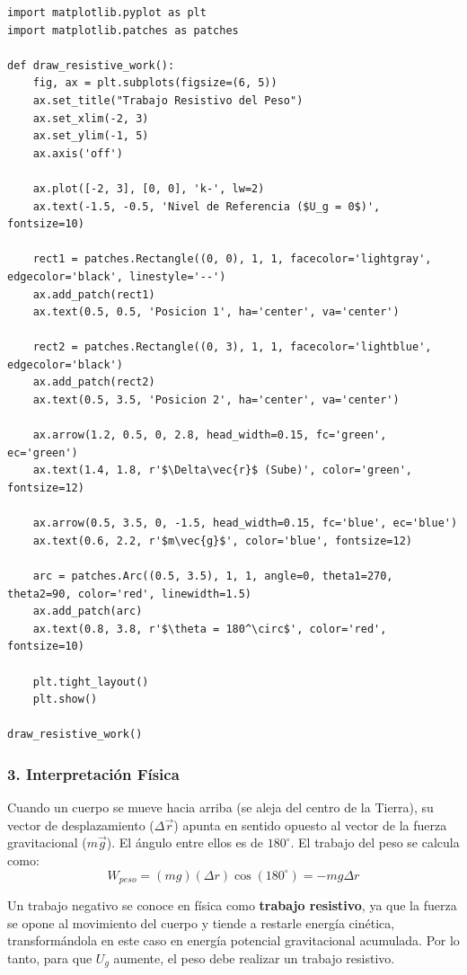 \documentclass[12pt, a4paper]{article}
\begin{document}
\begin{lstlisting}
import matplotlib.pyplot as plt
import matplotlib.patches as patches

def draw_resistive_work():
    fig, ax = plt.subplots(figsize=(6, 5))
    ax.set_title("Trabajo Resistivo del Peso")
    ax.set_xlim(-2, 3)
    ax.set_ylim(-1, 5)
    ax.axis('off')

    ax.plot([-2, 3], [0, 0], 'k-', lw=2)
    ax.text(-1.5, -0.5, 'Nivel de Referencia ($U_g = 0$)', fontsize=10)

    rect1 = patches.Rectangle((0, 0), 1, 1, facecolor='lightgray', edgecolor='black', linestyle='--')
    ax.add_patch(rect1)
    ax.text(0.5, 0.5, 'Posicion 1', ha='center', va='center')

    rect2 = patches.Rectangle((0, 3), 1, 1, facecolor='lightblue', edgecolor='black')
    ax.add_patch(rect2)
    ax.text(0.5, 3.5, 'Posicion 2', ha='center', va='center')

    ax.arrow(1.2, 0.5, 0, 2.8, head_width=0.15, fc='green', ec='green')
    ax.text(1.4, 1.8, r'$\Delta\vec{r}$ (Sube)', color='green', fontsize=12)

    ax.arrow(0.5, 3.5, 0, -1.5, head_width=0.15, fc='blue', ec='blue')
    ax.text(0.6, 2.2, r'$m\vec{g}$', color='blue', fontsize=12)

    arc = patches.Arc((0.5, 3.5), 1, 1, angle=0, theta1=270, theta2=90, color='red', linewidth=1.5)
    ax.add_patch(arc)
    ax.text(0.8, 3.8, r'$\theta = 180^\circ$', color='red', fontsize=10)

    plt.tight_layout()
    plt.show()

draw_resistive_work()
\end{lstlisting}

\subsubsection*{3. Interpretación Física}
Cuando un cuerpo se mueve hacia arriba (se aleja del centro de la Tierra), su vector de desplazamiento ($\Delta\vec{r}$) apunta en sentido opuesto al vector de la fuerza gravitacional ($m\vec{g}$). El ángulo entre ellos es de $180^\circ$.
El trabajo del peso se calcula como:
$$W_{peso} = (mg)(\Delta r) \cos(180^\circ) = -mg\Delta r$$

Un trabajo negativo se conoce en física como \textbf{trabajo resistivo}, ya que la fuerza se opone al movimiento del cuerpo y tiende a restarle energía cinética, transformándola en este caso en energía potencial gravitacional acumulada. Por lo tanto, para que $U_g$ aumente, el peso debe realizar un trabajo resistivo.
\end{document}
